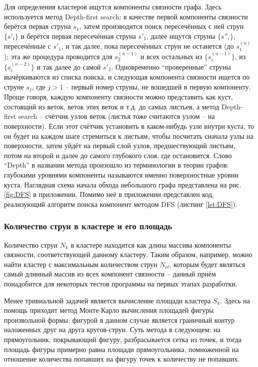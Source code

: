 Для определения кластеров ищутся компоненты связности графа. Здесь используется метод Depth-first search: в качестве первой компоненты связности берётся первая струна $s_1$, затем производится поиск пересечённых с ней струн $\{s'_i\}$ и берётся первая пересечённая струна $s'_1$, далее ищутся струны $\{s''_i\}$, пересечённые с $s'_1$, и так далее, пока пересечённых струн не останется (до $s^{(n)}_1$); эта же процедура проводится для $s^{(n-1)}_2$ и всех остальных из $\{s^{(n-1)}_i\}$, из $\{s^{(n-2)}_i\}$ и так далее до самой $s'_2$. Одновременно ``проверенные'' струны вычёркиваются из списка поиска, и следующая компонента связности ищется по струне $s_j$, где $j > 1$ -- первый номер струны, не вошедшей в первую компоненту. Проще говоря, каждую компоненту связности можно представить как куст, состоящий из веток, веток этих веток и т.д. до самых листьев, а метод Depth-first search -- счётчик узлов веток (листья тоже считаются узлом -- на поверхности). Если этот счётчик установить в каком-нибудь узле внутри куста, то он будет на каждом шаге стремиться к листьям, чтобы посчитать сначала узлы на поверхности, затем уйдёт на первый слой узлов, предшествующий листьям, потом на второй и далее до самого глубокого слоя, где остановится. Слово ``Depth'' в названии метода произошло из терминологии в теории графов: глубокими уровнями компоненты называются именно поверхностные уровни куста. Наглядная схема начала обхода небольшого графа представлена на рис. \ref{fig:DFS} в приложении. Помимо неё в приложении представлен код, реализующий алгоритм поиска компонент методом DFS (листинг \ref{lst:DFS}).

\subsubsection{Количество струн в кластере и его площадь}
Количество струн $N_k$ в кластере находится как длина массива компоненты связности, соответствующей данному кластеру. Таким образом, например, можно найти кластер с максимальным количеством струн $N_{cl}$, которым будет являться самый длинный массив из всех компонент связности -- данный приём понадобится для некоторых тестов программы на первых этапах разработки. 

Менее тривиальной задачей является вычисление площади кластера $S_k$. Здесь на помощь приходит метод Монте-Карло вычисления площадей фигуры произвольной формы: фигурой в данном случае является граничный контур наложенных друг на друга кругов-струн. Суть метода в следующем: на прямоугольник, покрывающий фигуру, разбрасывается сетка из точек, и тогда площадь фигуры примерно равна площади прямоугольника, помноженной на отношение количества попавших на фигуру точек к количеству не попавших.
